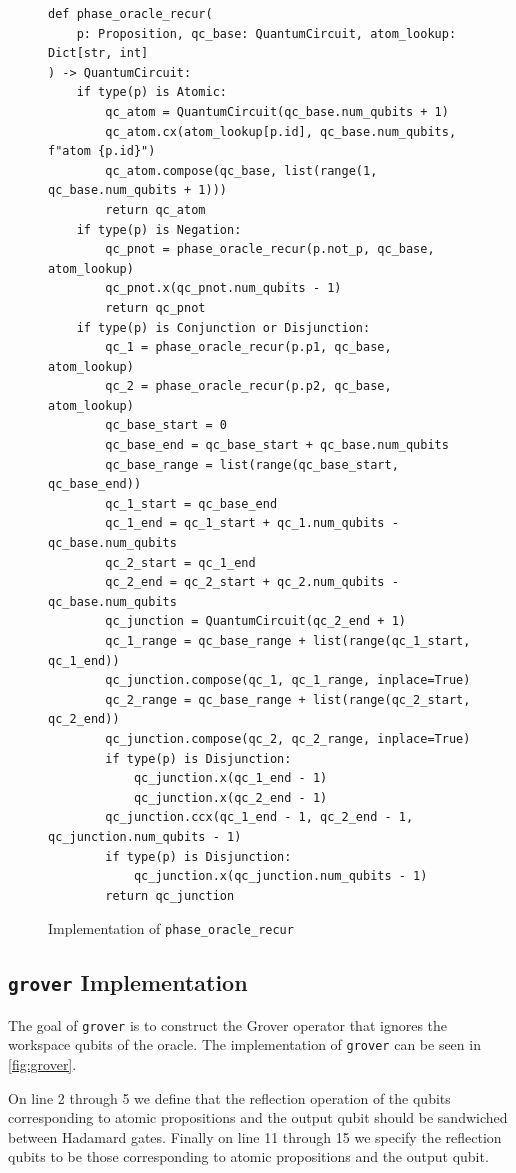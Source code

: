 \begin{figure}[H]
\centering
\begin{verbatim}
def phase_oracle_recur(
    p: Proposition, qc_base: QuantumCircuit, atom_lookup: Dict[str, int]
) -> QuantumCircuit:
    if type(p) is Atomic:
        qc_atom = QuantumCircuit(qc_base.num_qubits + 1)
        qc_atom.cx(atom_lookup[p.id], qc_base.num_qubits, f"atom {p.id}")
        qc_atom.compose(qc_base, list(range(1, qc_base.num_qubits + 1)))
        return qc_atom
    if type(p) is Negation:
        qc_pnot = phase_oracle_recur(p.not_p, qc_base, atom_lookup)
        qc_pnot.x(qc_pnot.num_qubits - 1)
        return qc_pnot
    if type(p) is Conjunction or Disjunction:
        qc_1 = phase_oracle_recur(p.p1, qc_base, atom_lookup)
        qc_2 = phase_oracle_recur(p.p2, qc_base, atom_lookup)
        qc_base_start = 0
        qc_base_end = qc_base_start + qc_base.num_qubits
        qc_base_range = list(range(qc_base_start, qc_base_end))
        qc_1_start = qc_base_end
        qc_1_end = qc_1_start + qc_1.num_qubits - qc_base.num_qubits
        qc_2_start = qc_1_end
        qc_2_end = qc_2_start + qc_2.num_qubits - qc_base.num_qubits
        qc_junction = QuantumCircuit(qc_2_end + 1)
        qc_1_range = qc_base_range + list(range(qc_1_start, qc_1_end))
        qc_junction.compose(qc_1, qc_1_range, inplace=True)
        qc_2_range = qc_base_range + list(range(qc_2_start, qc_2_end))
        qc_junction.compose(qc_2, qc_2_range, inplace=True)
        if type(p) is Disjunction:
            qc_junction.x(qc_1_end - 1)
            qc_junction.x(qc_2_end - 1)
        qc_junction.ccx(qc_1_end - 1, qc_2_end - 1, qc_junction.num_qubits - 1)
        if type(p) is Disjunction:
            qc_junction.x(qc_junction.num_qubits - 1)
        return qc_junction
\end{verbatim}
\caption{Implementation of \texttt{phase\_oracle\_recur} }
\label{fig:phase_oracle_recur}
\end{figure}

\subsection{\texttt{grover} Implementation}\label{subsec:grover-implementation}

The goal of \texttt{grover} is to construct the Grover operator that ignores the workspace qubits of the oracle.
The implementation of \texttt{grover} can be seen in \autoref{fig:grover}.

On line 2 through 5 we define that the reflection operation of the qubits corresponding to atomic propositions and the output qubit should be sandwiched between Hadamard gates.
Finally on line 11 through 15 we specify the reflection qubits to be those corresponding to atomic propositions and the output qubit.


